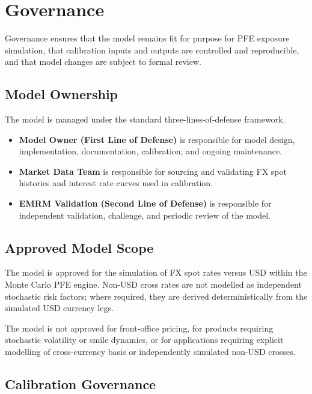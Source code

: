 \section{Governance}\label{Governance}
 


 Governance ensures that the model remains fit for purpose for PFE exposure simulation, that calibration inputs and outputs are controlled and reproducible, and that model changes are subject to formal review.

\subsection{Model Ownership}

The model is managed under the standard three-lines-of-defense framework.

\begin{itemize}
	\item \textbf{Model Owner (First Line of Defense)} is responsible for model design, implementation, documentation, calibration, and ongoing maintenance.
	\item \textbf{Market Data Team} is responsible for sourcing and validating FX spot histories and interest rate curves used in calibration.
	\item \textbf{EMRM Validation (Second Line of Defense)} is responsible for independent validation, challenge, and periodic review of the model.
\end{itemize}

\subsection{Approved Model Scope}

The model is approved for the simulation of FX spot rates versus USD within the Monte Carlo PFE engine. Non-USD cross rates are not modelled as independent stochastic risk factors; where required, they are derived deterministically from the simulated USD currency legs.

The model is not approved for front-office pricing, for products requiring stochastic volatility or smile dynamics, or for applications requiring explicit modelling of cross-currency basis or independently simulated non-USD crosses.

\subsection{Calibration Governance}


